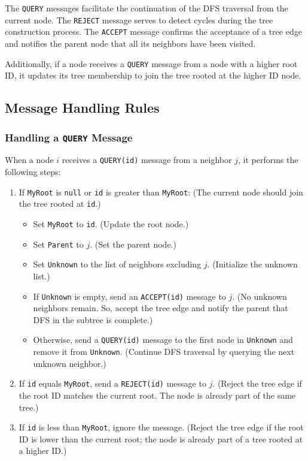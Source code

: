 The \texttt{QUERY} messages facilitate the continuation of the DFS traversal from the current node. The \texttt{REJECT} message serves to detect cycles during the tree construction process. The \texttt{ACCEPT} message confirms the acceptance of a tree edge and notifies the parent node that all its neighbors have been visited. 

Additionally, if a node receives a \texttt{QUERY} message from a node with a higher root ID, it updates its tree membership to join the tree rooted at the higher ID node.

\subsection{Message Handling Rules}

\subsubsection{Handling a \texttt{QUERY} Message}
When a node \(i\) receives a \texttt{QUERY(id)} message from a neighbor \(j\), it performs the following steps:
\begin{enumerate}
    \item If \texttt{MyRoot} is \texttt{null} or \texttt{id} is greater than \texttt{MyRoot}: (The current node should join the tree rooted at \texttt{id}.)
    \begin{itemize}
        \item Set \texttt{MyRoot} to \texttt{id}. (Update the root node.)
        \item Set \texttt{Parent} to \(j\). (Set the parent node.)
        \item Set \texttt{Unknown} to the list of neighbors excluding \(j\). (Initialize the unknown list.)
        \item If \texttt{Unknown} is empty, send an \texttt{ACCEPT(id)} message to \(j\). (No unknown neighbors remain. So, accept the tree edge and notify the parent that DFS in the subtree is complete.)
        \item Otherwise, send a \texttt{QUERY(id)} message to the first node in \texttt{Unknown} and remove it from \texttt{Unknown}. (Continue DFS traversal by querying the next unknown neighbor.)
    \end{itemize}
    \item If \texttt{id} equals \texttt{MyRoot}, send a \texttt{REJECT(id)} message to \(j\). (Reject the tree edge if the root ID matches the current root. The node is already part of the same tree.)
    \item If \texttt{id} is less than \texttt{MyRoot}, ignore the message. (Reject the tree edge if the root ID is lower than the current root; the node is already part of a tree rooted at a higher ID.)
\end{enumerate}

